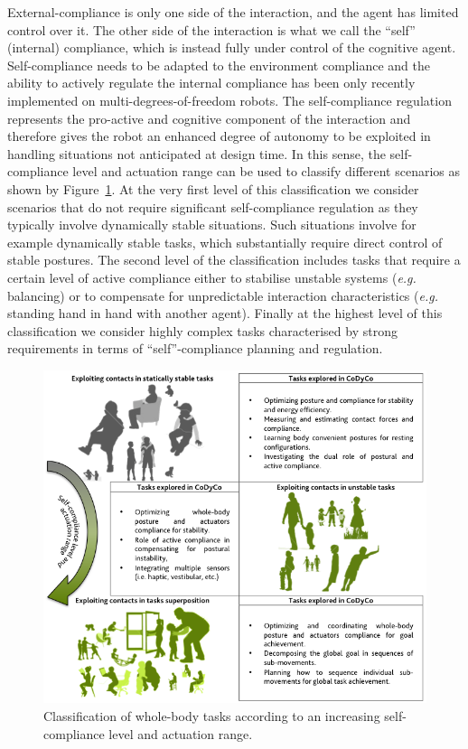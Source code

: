 \documentclass[final,5p,twocolumn]{elsarticle}
\begin{document}
External-compliance is only one side of the interaction, and the agent has limited control over it. The other side of the interaction is what we call the ``self'' (internal) compliance, which is instead fully under control of the cognitive agent. Self-compliance needs to be adapted to the environment compliance and the ability to actively regulate the internal compliance has been only recently implemented on multi-degrees-of-freedom robots. The self-compliance regulation represents the pro-active and cognitive component of the interaction and therefore gives the robot an enhanced degree of autonomy to be exploited in handling situations not anticipated at design time. In this sense, the self-compliance level and actuation range can be used to classify different scenarios as shown by Figure~\ref{fig:classification2}. At the very first level of this classification we consider scenarios that do not require significant self-compliance regulation as they typically involve dynamically stable situations. Such situations involve for example dynamically stable tasks, which substantially require direct control of stable postures. The second level of the classification includes tasks that require a certain level of active compliance either to stabilise unstable systems (\textit{e.g.} balancing) or to compensate for unpredictable interaction characteristics (\textit{e.g.} standing hand in hand with another agent). Finally at the highest level of this classification we consider highly complex tasks characterised by strong requirements in terms of ``self''-compliance planning and regulation.

\begin{figure}
\centering
\includegraphics[width=\linewidth]{./images/classification2.png}
\caption{Classification of whole-body tasks according to an increasing self-compliance level and actuation range.}
\label{fig:classification2}
\end{figure}
\end{document}
